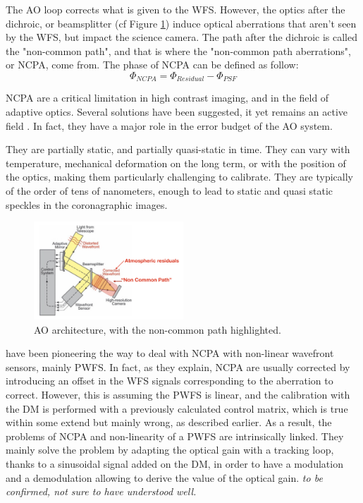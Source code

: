 \documentclass[twocolumn]{aastex62}
\begin{document}
The AO loop corrects what is given to the WFS. However, the optics after the dichroic, or beamsplitter (cf Figure \ref{fig:NCPA}) induce optical aberrations that aren't seen by the WFS, but impact the science camera. The path after the dichroic is called the "non-common path", and that is where the "non-common path aberrations", or NCPA, come from. 
The phase of NCPA can be defined as follow: 
\begin{equation}
    \Phi_{NCPA} = \Phi_{Residual} - \Phi_{PSF}
\end{equation}

NCPA are a critical limitation in high contrast imaging, and in the field of adaptive optics. Several solutions have been suggested, it yet remains an active field \citep{Vigan2018NCPA, BosFF2020}. In fact, they have a major role in the error budget of the AO system.

They are partially static, and partially quasi-static in time. They can vary with temperature, mechanical deformation on the long term, or with the position of the optics, making them particularly challenging to calibrate. They are typically of the order of tens of nanometers, enough to lead to static and quasi static speckles in the coronagraphic images.

\begin{figure}[h!]
  \centering
    \includegraphics[width=0.5\textwidth]{fig/NCPA.png}
      \caption{AO architecture, with the non-common path highlighted.}
    \label{fig:NCPA}
\end{figure}


\cite{Esposito2015} have been pioneering the way to deal with NCPA with non-linear wavefront sensors, mainly PWFS. 
In fact, as they explain, NCPA are usually corrected by introducing an offset in the WFS signals corresponding to the aberration to correct. However, this is assuming the PWFS is linear, and the calibration with the DM is performed with a previously calculated control matrix, which is true within some extend but mainly wrong, as described earlier. 
As a result, the problems of NCPA and non-linearity of a PWFS are intrinsically linked. They mainly solve the problem by adapting the optical gain with a tracking loop, thanks to a sinusoidal signal added on the DM, in order to have a modulation and a demodulation allowing to derive the value of the optical gain. \textit{to be confirmed, not sure to have understood well.}\\
\end{document}
